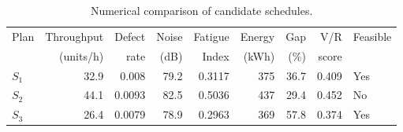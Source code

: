 \begin{table}[htbp]
\centering
\caption{Numerical comparison of candidate schedules.}
\label{tab:numerical-sim}
\small
\begin{tabular}{@{}lrrrrrrrl@{}}
\toprule
Plan & Throughput & Defect & Noise & Fatigue & Energy & Gap & V/R & Feasible \\
     & (units/h)  & rate   & (dB)  & Index   & (kWh)  & (\%) & score &         \\
\midrule
$S_{1}$ & 32.9 & 0.008 & 79.2 & 0.3117 & 375 & 36.7 & 0.409 & Yes \\
$S_{2}$ & 44.1 & 0.0093 & 82.5 & 0.5036 & 437 & 29.4 & 0.452 & No \\
$S_{3}$ & 26.4 & 0.0079 & 78.9 & 0.2963 & 369 & 57.8 & 0.374 & Yes \\
\bottomrule
\end{tabular}
\end{table}
